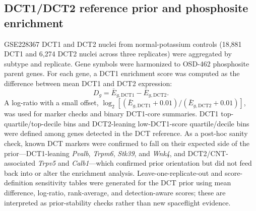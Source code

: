 \documentclass[11pt]{article}
\newcommand{\gene}[1]{\textit{#1}}
\begin{document}
\subsection{DCT1/DCT2 reference prior and phosphosite enrichment}

GSE228367 DCT1 and DCT2 nuclei from normal-potassium controls (18{,}881 DCT1 and 6{,}274 DCT2 nuclei across three replicates) were aggregated by subtype and replicate. Gene symbols were harmonized to OSD-462 phosphosite parent genes. For each gene, a DCT1 enrichment score was computed as the difference between mean DCT1 and DCT2 expression:
\[
D_g=\bar{E}_{g,\mathrm{DCT1}}-\bar{E}_{g,\mathrm{DCT2}}.
\]
A log-ratio with a small offset, $\log_2[(\bar{E}_{g,\mathrm{DCT1}}+0.01)/(\bar{E}_{g,\mathrm{DCT2}}+0.01)]$, was used for marker checks and binary DCT1-core summaries. DCT1 top-quartile/top-decile bins and DCT2-leaning low-DCT1-score quartile/decile bins were defined among genes detected in the DCT reference. As a post-hoc sanity check, known DCT markers were confirmed to fall on their expected side of the prior---DCT1-leaning \gene{Pvalb}, \gene{Trpm6}, \gene{Stk39}, and \gene{Wnk4}, and DCT2/CNT-associated \gene{Trpv5} and \gene{Calb1}---which confirmed prior orientation but did not feed back into or alter the enrichment analysis. Leave-one-replicate-out and score-definition sensitivity tables were generated for the DCT prior using mean difference, log-ratio, rank-average, and detection-aware scores; these are interpreted as prior-stability checks rather than new spaceflight evidence.
\end{document}
